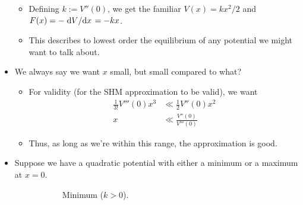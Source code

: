 \documentclass[../notes.tex]{subfiles}
\begin{document}
\begin{itemize}
\begin{itemize}
        \item Defining $k:=V''(0)$, we get the familiar $V(x)=kx^2/2$ and $F(x)=-\dv*{V}{x}=-kx$.
        \item This describes to lowest order the equilibrium of any potential we might want to talk about.
    \end{itemize}
    \item We always say we want $x$ small, but small compared to what?
    \begin{itemize}
        \item For validity (for the SHM approximation to be valid), we want
        \begin{align*}
            \frac{1}{3!}V'''(0)x^3 &\ll \frac{1}{2}V''(0)x^2\\
            x &\ll \frac{V''(0)}{V'''(0)}
        \end{align*}
        \item Thus, as long as we're within this range, the approximation is good.
    \end{itemize}
    \item Suppose we have a quadratic potential with either a minimum or a maximum at $x=0$.
    \begin{figure}[H]
        \centering
        \begin{subfigure}[b]{0.3\linewidth}
            \centering
            \caption{Minimum ($k>0$).}
            \label{fig:SHOpotentiala}
        \end{subfigure}
        \begin{subfigure}[b]{0.3\linewidth}
            \centering
\end{subfigure}
\end{figure}
\end{itemize}
\end{document}
